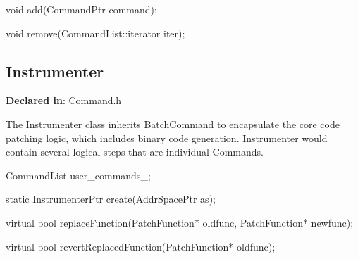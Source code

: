 \begin{apient}
void add(CommandPtr command);
\end{apient}



\begin{apient}
void remove(CommandList::iterator iter);
\end{apient}


\subsection{Instrumenter}
\label{sec-3.2.5}

\textbf{Declared in}: Command.h

The Instrumenter class inherits BatchCommand to encapsulate the core code
patching logic, which includes binary code generation. Instrumenter would
contain several logical steps that are individual Commands.


\begin{apient}
CommandList user_commands_;
\end{apient}



\begin{apient}
static InstrumenterPtr create(AddrSpacePtr as);
\end{apient}


\begin{apient}
virtual bool replaceFunction(PatchFunction* oldfunc, PatchFunction* newfunc);
\end{apient}



\begin{apient}
virtual bool revertReplacedFunction(PatchFunction* oldfunc);
\end{apient}

